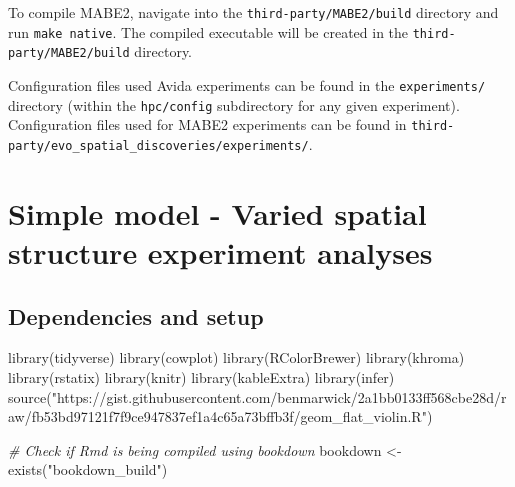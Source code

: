 \documentclass[
]{book}
\newenvironment{Shaded}{\begin{snugshade}}{\end{snugshade}}
\newcommand{\CommentTok}[1]{\textcolor[rgb]{0.56,0.35,0.01}{\textit{#1}}}
\newcommand{\FunctionTok}[1]{\textcolor[rgb]{0.00,0.00,0.00}{#1}}
\newcommand{\NormalTok}[1]{#1}
\newcommand{\OtherTok}[1]{\textcolor[rgb]{0.56,0.35,0.01}{#1}}
\newcommand{\StringTok}[1]{\textcolor[rgb]{0.31,0.60,0.02}{#1}}
\begin{document}
To compile MABE2, navigate into the \texttt{third-party/MABE2/build} directory and run \texttt{make\ native}.
The compiled executable will be created in the \texttt{third-party/MABE2/build} directory.

Configuration files used Avida experiments can be found in the \texttt{experiments/} directory (within the \texttt{hpc/config} subdirectory for any given experiment).
Configuration files used for MABE2 experiments can be found in \texttt{third-party/evo\_spatial\_discoveries/experiments/}.

\hypertarget{simple-model---varied-spatial-structure-experiment-analyses}{%
\chapter{Simple model - Varied spatial structure experiment analyses}\label{simple-model---varied-spatial-structure-experiment-analyses}}

\hypertarget{dependencies-and-setup}{%
\section{Dependencies and setup}\label{dependencies-and-setup}}

\begin{Shaded}
\begin{Highlighting}[]
\FunctionTok{library}\NormalTok{(tidyverse)}
\FunctionTok{library}\NormalTok{(cowplot)}
\FunctionTok{library}\NormalTok{(RColorBrewer)}
\FunctionTok{library}\NormalTok{(khroma)}
\FunctionTok{library}\NormalTok{(rstatix)}
\FunctionTok{library}\NormalTok{(knitr)}
\FunctionTok{library}\NormalTok{(kableExtra)}
\FunctionTok{library}\NormalTok{(infer)}
\FunctionTok{source}\NormalTok{(}\StringTok{"https://gist.githubusercontent.com/benmarwick/2a1bb0133ff568cbe28d/raw/fb53bd97121f7f9ce947837ef1a4c65a73bffb3f/geom\_flat\_violin.R"}\NormalTok{)}
\end{Highlighting}
\end{Shaded}

\begin{Shaded}
\begin{Highlighting}[]
\CommentTok{\# Check if Rmd is being compiled using bookdown}
\NormalTok{bookdown }\OtherTok{\textless{}{-}} \FunctionTok{exists}\NormalTok{(}\StringTok{"bookdown\_build"}\NormalTok{)}
\end{Highlighting}
\end{Shaded}
\end{document}
